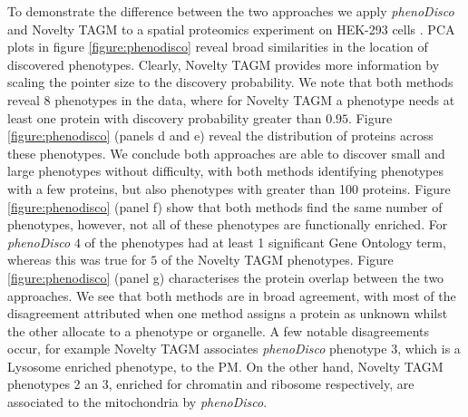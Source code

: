 \documentclass[12pt,english]{article}
\begin{document}
To demonstrate the difference between the two approaches we apply \textit{phenoDisco} and Novelty TAGM to a spatial proteomics experiment on HEK-293 cells \citep{Breckels:2013}. PCA plots in figure \ref{figure:phenodisco} reveal broad similarities in the location of discovered phenotypes. Clearly, Novelty TAGM provides more information by scaling the pointer size to the discovery probability. We note that both methods reveal 8 phenotypes in the data, where for Novelty TAGM a phenotype needs at least one protein with discovery probability greater than $0.95$. Figure \ref{figure:phenodisco} (panels d and e) reveal the distribution of proteins across these phenotypes. We conclude both approaches are able to discover small and large phenotypes without difficulty, with both methods identifying phenotypes with a few proteins, but also phenotypes with greater than 100 proteins. Figure \ref{figure:phenodisco} (panel f) show that both methods find the same number of phenotypes, however, not all of these phenotypes are functionally enriched. For \textit{phenoDisco} $4$ of the phenotypes had at least 1 significant Gene Ontology term, whereas this was true for $5$ of the Novelty TAGM phenotypes. Figure \ref{figure:phenodisco} (panel g) characterises the protein overlap between the two approaches. We see that both methods are in broad agreement, with most of the disagreement attributed when one method assigns a protein as unknown whilst the other allocate to a phenotype or organelle. A few notable disagreements occur, for example Novelty TAGM associates \textit{phenoDisco} phenotype 3, which is a Lysosome enriched phenotype, to the PM. On the other hand, Novelty TAGM phenotypes 2 an 3, enriched for chromatin and ribosome respectively, are associated to the mitochondria by \textit{phenoDisco}.
\end{document}
